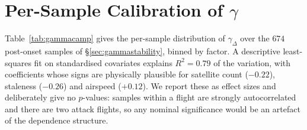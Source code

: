 \documentclass[conference,letterpaper,10pt]{IEEEtran}   %
\newcommand{\code}[1]{\texttt{#1}}
\begin{document}
\section{Per-Sample Calibration of $\gamma$}
\label{app:gamma}
Table~\ref{tab:gammacamp} gives the per-sample distribution of $\gamma_{\Delta}$
over the $674$ post-onset samples of \S\ref{sec:gammastability}, binned by
factor. A descriptive least-squares fit on standardised covariates explains
$R^{2}=0.79$ of the variation, with coefficients whose signs are physically
plausible for satellite count ($-0.22$), staleness ($-0.26$) and airspeed
($+0.12$). We report these as effect sizes and deliberately give no $p$-values:
samples within a flight are strongly autocorrelated and there are two attack
flights, so any nominal significance would be an artefact of the dependence
structure.

\begin{table}[t]
\centering
\caption{Per-sample distribution of the baseline-corrected rate
$\gamma_{\Delta}$, binned by factor, over $674$ post-onset samples. Counts are
shown because coverage is uneven: airspeed bins above $1$\,m/s are
sparse, since these are hover flights. HDOP is the horizontal dilution of
precision. Generated by \code{experiments/gamma\_campaign.py}.}
\label{tab:gammacamp}
\scriptsize
\renewcommand{\arraystretch}{1.02}

\end{table}
\end{document}
